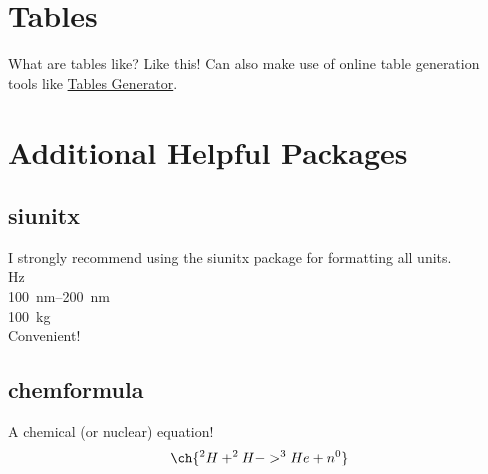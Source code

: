 \documentclass[hidelinks, 12pt]{article}%
\begin{document}
    \section{Tables}
        What are tables like?
        Like this!
        Can also make use of online table generation tools like \href{https://www.tablesgenerator.com/}{Tables Generator}.

    \section{Additional Helpful Packages}
        \subsection{siunitx}
            I strongly recommend using the siunitx package for formatting all units.
            \\\si{\hertz}
            \\\SIrange{100}{200}{\nano\meter}
            \\\SI{100}{\kilo\gram}
            \\Convenient!

        \subsection{chemformula}
            A chemical (or nuclear) equation!
            \begin{equation}
                \ch{
                ^{2}H + ^{2}H -> ^{3}He + n^{0}
                }
                \label{eqt:nucEnerReleased}
            \end{equation}
\end{document}

